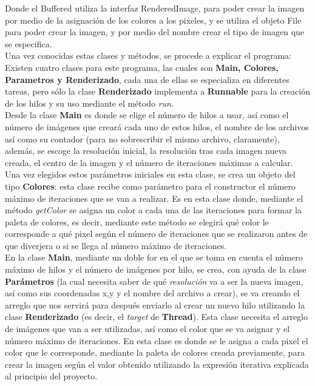 \documentclass[12pt,a4paper]{article}
\begin{document}
			Donde el Buffered utiliza la interfaz RenderedImage, para poder crear la imagen por medio de la asignación de los colores a los pixeles, y se utiliza el objeto File para poder crear la imagen, y por medio del nombre crear el tipo de imagen que se especifica.\\
			Una vez conocidas estas clases y métodos, se procede a explicar el programa:\\
			Existen cuatro clases para este programa, las cuales son \textbf{Main, Colores, Parametros y Renderizado}, cada una de ellas se especializa en diferentes tareas, pero sólo la clase \textbf{Renderizado} implementa a \textbf{Runnable} para la creación de los hilos y su uso mediante el método \textit{run}.\\
			Desde la clase \textbf{Main} es donde se elige el número de hilos a usar, así como el número de imágenes que creará cada uno de estos hilos, el nombre de los archivos así como su contador (para no sobrescribir el mismo archivo, claramente), además, se escoge la resolución inicial, la resolución tras cada imagen nueva creada, el centro de la imagen y el número de iteraciones máximas a calcular. Una vez elegidos estos parámetros iniciales en esta clase, se crea un objeto del tipo \textbf{Colores}: esta clase recibe como parámetro para el constructor el número máximo de iteraciones que se van a realizar. Es en esta clase donde, mediante el método \textit{getColor} se asigna un color a cada una de las iteraciones para formar la paleta de colores, es decir, mediante este método se elegirá qué color le corresponde a qué pixel según el número de iteraciones que se realizaron antes de que diverjera o si se llega al número máximo de iteraciones.\\
			En la clase \textbf{Main}, mediante un doble for en el que se toma en cuenta el número máximo de hilos y el número de imágenes por hilo, se crea, con ayuda de la clase \textbf{Parámetros} (la cual necesita saber de qué \textit{resolución} va a ser la nueva imagen, así como sus coordenadas x,y y el nombre del archivo a crear), se va creando el arreglo que nos servirá para después enviarlo al crear un nuevo hilo utilizando la clase \textbf{Renderizado} (es decir, el \textit{target} de \textbf{Thread}). Esta clase necesita el arreglo de imágenes que van a ser utilizadas, así como el color que se va asignar y el número máximo de iteraciones. En esta clase es donde se le asigna a cada pixel el color que le corresponde, mediante la paleta de colores creada previamente, para crear la imagen según el valor obtenido utilizando la expresión iterativa explicada al principio del proyecto.
						
\end{document}
